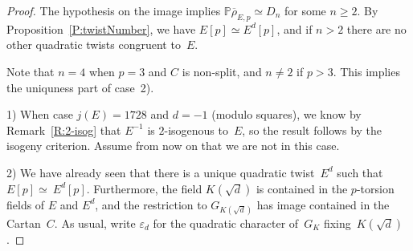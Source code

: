 \documentclass[12pt]{amsart}
\newcommand{\PP}{\mathbb{P}}
\newcommand{\rhobar}{{\overline{\rho}}}
\newcommand{\eps}{\varepsilon}
\DeclareMathOperator{\Tr}{Tr}
\numberwithin{equation}{section}
\theoremstyle{definition}
\theoremstyle{remark}
\begin{document}
\begin{proof} 
The hypothesis on the image implies $\PP \rhobar_{E,p} \simeq D_n$ for
some $n \geq 2$.  By Proposition~\ref{P:twistNumber}, we have $E[p]
\simeq E^d[p]$, and if $n>2$ there are no other quadratic twists
congruent to~$E$.

Note that $n=4$ when $p =3$ and $C$ is non-split, and $n \neq 2$ if $p
> 3$.  This implies the uniquness part of case~2).

1) When case $j(E)=1728$ and $d=-1$ (modulo squares), we know by
Remark~\ref{R:2-isog} that $E^{-1}$ is $2$-isogenous to~$E$, so the
result follows by the isogeny criterion.  Assume from now on that we
are not in this case.

2) We have already seen that there is a unique quadratic twist~$E^d$
such that $E[p] \simeq~E^d[p]$.  Furthermore, the field $K(\sqrt{d})$
is contained in the $p$-torsion fields of $E$ and $E^d$, and the
restriction to $G_{K(\sqrt{d})}$ has image contained in the Cartan~$C$.
As usual, write $\eps_d$ for the quadratic character of~$G_K$
fixing~$K(\sqrt{d})$.

\begin{comment}
 We first prove that $E[p] \simeq E^d[p]$ as $G_K$-modules. 
Note that $\rhobar_{{E^d}, p} = \rhobar_{E, p} \otimes \eps$, and
hence for all $\sigma \in G_K$ we have
\[\Tr \rhobar_{{E^d},p}(\sigma) = \eps(\sigma) \cdot \Tr \rhobar_{E,p}(\sigma).\]

Note that, if $\eps(\sigma) = -1$ then $\rhobar_{E,p}(\sigma) \in N\backslash C$ and $\Tr \rhobar_{E,p}(\sigma) = 0$, so also $\Tr \rhobar_{E^d,p}(\sigma) = 0$;
therefore, $\Tr \rhobar_{E,p}(\sigma) = \Tr \rhobar_{E^d,p}(\sigma)$ 
for all $\sigma \in G_K$. Since these representations are irreducible and have
the same traces it follows that they are isomorphic.
\end{comment}


\end{proof}
\end{document}
